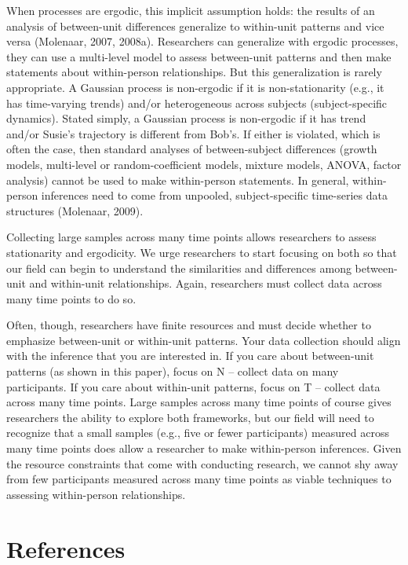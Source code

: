 \documentclass[english,,man]{apa6}
\theoremstyle{definition}
\theoremstyle{definition}
\theoremstyle{definition}
\theoremstyle{remark}
\begin{document}
When processes are ergodic, this implicit assumption holds: the results
of an analysis of between-unit differences generalize to within-unit
patterns and vice versa (Molenaar, 2007, 2008a). Researchers can
generalize with ergodic processes, they can use a multi-level model to
assess between-unit patterns and then make statements about
within-person relationships. But this generalization is rarely
appropriate. A Gaussian process is non-ergodic if it is non-stationarity
(e.g., it has time-varying trends) and/or heterogeneous across subjects
(subject-specific dynamics). Stated simply, a Gaussian process is
non-ergodic if it has trend and/or Susie's trajectory is different from
Bob's. If either is violated, which is often the case, then standard
analyses of between-subject differences (growth models, multi-level or
random-coefficient models, mixture models, ANOVA, factor analysis)
cannot be used to make within-person statements. In general,
within-person inferences need to come from unpooled, subject-specific
time-series data structures (Molenaar, 2009).

Collecting large samples across many time points allows researchers to
assess stationarity and ergodicity. We urge researchers to start
focusing on both so that our field can begin to understand the
similarities and differences among between-unit and within-unit
relationships. Again, researchers must collect data across many time
points to do so.

Often, though, researchers have finite resources and must decide whether
to emphasize between-unit or within-unit patterns. Your data collection
should align with the inference that you are interested in. If you care
about between-unit patterns (as shown in this paper), focus on N --
collect data on many participants. If you care about within-unit
patterns, focus on T -- collect data across many time points. Large
samples across many time points of course gives researchers the ability
to explore both frameworks, but our field will need to recognize that a
small samples (e.g., five or fewer participants) measured across many
time points does allow a researcher to make within-person inferences.
Given the resource constraints that come with conducting research, we
cannot shy away from few participants measured across many time points
as viable techniques to assessing within-person relationships.

\newpage

\hypertarget{references}{%
\section{References}\label{references}}
\end{document}
